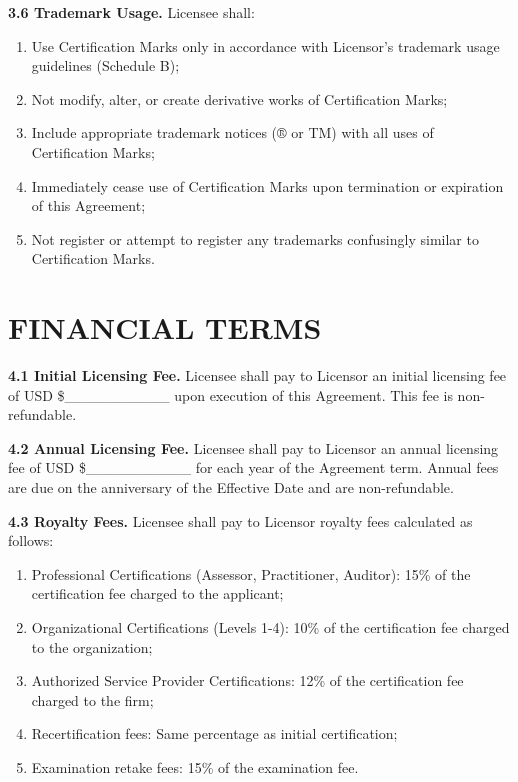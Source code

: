 \documentclass[11pt,a4paper]{article}
\begin{document}
\textbf{3.6 Trademark Usage.} Licensee shall:

\begin{enumerate}[label=\alph*)]
\item Use Certification Marks only in accordance with Licensor's trademark usage guidelines (Schedule B);
\item Not modify, alter, or create derivative works of Certification Marks;
\item Include appropriate trademark notices (® or TM) with all uses of Certification Marks;
\item Immediately cease use of Certification Marks upon termination or expiration of this Agreement;
\item Not register or attempt to register any trademarks confusingly similar to Certification Marks.
\end{enumerate}

\section{FINANCIAL TERMS}

\textbf{4.1 Initial Licensing Fee.} Licensee shall pay to Licensor an initial licensing fee of USD \$\_\_\_\_\_\_\_\_\_\_ upon execution of this Agreement. This fee is non-refundable.

\textbf{4.2 Annual Licensing Fee.} Licensee shall pay to Licensor an annual licensing fee of USD \$\_\_\_\_\_\_\_\_\_\_ for each year of the Agreement term. Annual fees are due on the anniversary of the Effective Date and are non-refundable.

\textbf{4.3 Royalty Fees.} Licensee shall pay to Licensor royalty fees calculated as follows:

\begin{enumerate}[label=\alph*)]
\item Professional Certifications (Assessor, Practitioner, Auditor): 15\% of the certification fee charged to the applicant;
\item Organizational Certifications (Levels 1-4): 10\% of the certification fee charged to the organization;
\item Authorized Service Provider Certifications: 12\% of the certification fee charged to the firm;
\item Recertification fees: Same percentage as initial certification;
\item Examination retake fees: 15\% of the examination fee.
\end{enumerate}
\end{document}
